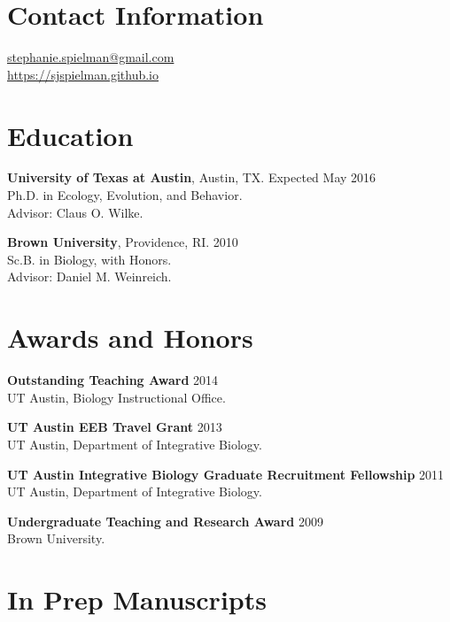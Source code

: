\documentclass[line, margin]{res}
\begin{document}


\begin{resume}
\vspace{0.5cm}
\section{Contact Information}
	\href{mailto:stephanie.spielman@gmail.com}{stephanie.spielman@gmail.com} \\
	\url{https://sjspielman.github.io}
	
\vspace{0.75cm}
	
\section{Education}

\textbf{University of Texas at Austin}, Austin, TX. \hfill Expected May 2016 \\ Ph.D. in Ecology, Evolution, and Behavior. \\ Advisor: Claus O. Wilke.


\textbf{Brown University}, Providence, RI.  \hfill 2010 \\ Sc.B. in Biology, with Honors. \\ Advisor: Daniel M. Weinreich.

\vspace{0.75cm}

\section{Awards and Honors}

\textbf{Outstanding Teaching Award} \hfill 2014 \\ UT Austin, Biology Instructional Office.

\textbf{UT Austin EEB Travel Grant} \hfill 2013 \\ UT Austin, Department of Integrative Biology.

\textbf{UT Austin Integrative Biology Graduate Recruitment Fellowship} \hfill 2011 \\ UT Austin, Department of Integrative Biology.

\textbf{Undergraduate Teaching and Research Award} \hfill 2009 \\ Brown University.

\vspace{0.75cm}
		
		
\section{In Prep Manuscripts}


\end{resume}
\end{document}
